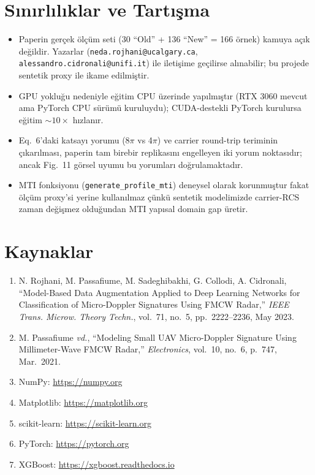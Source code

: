 \documentclass[11pt,a4paper]{article}
\begin{document}
\section{Sınırlılıklar ve Tartışma}
\begin{itemize}
    \item Paperin gerçek ölçüm seti (30 ``Old'' + 136 ``New'' = 166 örnek) kamuya açık değildir.
          Yazarlar (\texttt{neda.rojhani@ucalgary.ca}, \texttt{alessandro.cidronali@unifi.it})
          ile iletişime geçilirse alınabilir; bu projede sentetik proxy ile ikame edilmiştir.
    \item GPU yokluğu nedeniyle eğitim CPU üzerinde yapılmıştır (RTX 3060 mevcut ama PyTorch
          CPU sürümü kuruluydu); CUDA-destekli PyTorch kurulursa eğitim ${\sim}10\times$ hızlanır.
    \item Eq.~6'daki katsayı yorumu (8$\pi$ vs 4$\pi$) ve carrier round-trip teriminin çıkarılması,
          paperin tam birebir replikasını engelleyen iki yorum noktasıdır; ancak Fig.~11 görsel
          uyumu bu yorumları doğrulamaktadır.
    \item MTI fonksiyonu (\texttt{generate\_profile\_mti}) deneysel olarak korunmuştur fakat
          ölçüm proxy'si yerine kullanılmaz çünkü sentetik modelimizde carrier-RCS zaman
          değişmez olduğundan MTI yapısal domain gap üretir.
\end{itemize}

\section{Kaynaklar}
\begin{enumerate}
    \item N. Rojhani, M. Passafiume, M. Sadeghibakhi, G. Collodi, A. Cidronali,
          ``Model-Based Data Augmentation Applied to Deep Learning Networks for Classification
          of Micro-Doppler Signatures Using FMCW Radar,'' \emph{IEEE Trans. Microw. Theory Techn.},
          vol.~71, no.~5, pp.~2222--2236, May 2023.
    \item M. Passafiume \emph{vd.}, ``Modeling Small UAV Micro-Doppler Signature Using
          Millimeter-Wave FMCW Radar,'' \emph{Electronics}, vol.~10, no.~6, p.~747, Mar.~2021.
    \item NumPy: \url{https://numpy.org}
    \item Matplotlib: \url{https://matplotlib.org}
    \item scikit-learn: \url{https://scikit-learn.org}
    \item PyTorch: \url{https://pytorch.org}
    \item XGBoost: \url{https://xgboost.readthedocs.io}
\end{enumerate}
\end{document}
